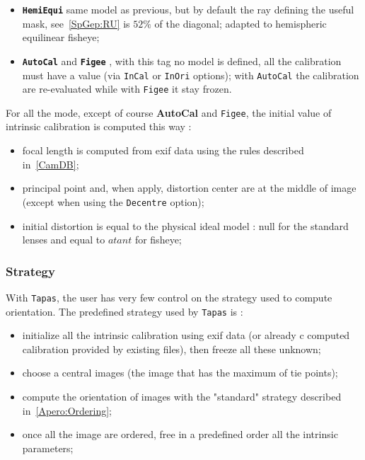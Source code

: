 \begin{itemize}
   \item {\tt \bf HemiEqui}  same model as previous, but  by default the ray defining 
         the useful mask, see~\ref{SpGep:RU} is $52\%$ of the diagonal; adapted
         to hemispheric equilinear fisheye;


   \item {\tt \bf AutoCal} and {\tt \bf Figee} , with this tag no model is defined,
         all the calibration must have a value (via {\tt InCal} or {\tt InOri} options);
         with {\tt  AutoCal} the calibration are re-evaluated while with {\tt  Figee}
         it stay frozen.

\end{itemize}


For all the mode, except of course {\bf AutoCal} and {\tt Figee},  the initial
value of intrinsic calibration is computed this way :

\begin{itemize}
   \item focal length is computed from exif data using the rules described in~\ref{CamDB};

   \item principal point and, when apply, distortion center are  at the middle 
         of image (except when using the {\tt Decentre} option);

   \item initial distortion is equal to the physical ideal model :   null for the
         standard lenses and equal to $atant$ for  fisheye;

\end{itemize}

\subsubsection{Strategy}

With {\tt Tapas}, the user has very few control on the  strategy used to compute
orientation.  The predefined strategy used by {\tt Tapas} is :

\begin{itemize}
   \item initialize all the intrinsic calibration using exif data (or already c
         computed calibration provided by existing files), then freeze all these unknown;

   \item choose a central images (the image that has the maximum of tie points);

   \item compute the orientation of images with the "standard" strategy described 
          in~\ref{Apero:Ordering};


   \item once all the image are ordered, free in a predefined order all the intrinsic
         parameters;

\end{itemize}

